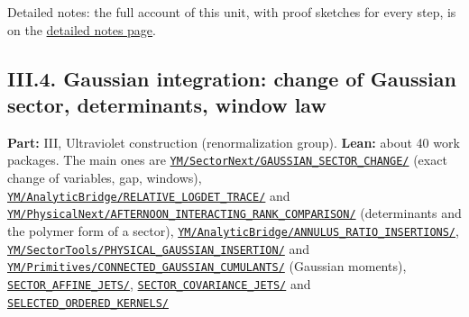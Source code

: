 \documentclass[
  letterpaper,
  11pt]{article}
\begin{document}
Detailed notes: the full account of this unit, with proof sketches for
every step, is on the
\href{https://github.com/scottnarmstrong/yang-mills-informalization/blob/main/outline/notes/III-3.md}{detailed
notes page}.

\subsection{III.4. Gaussian integration: change of Gaussian sector,
determinants, window
law}\label{iii.4.-gaussian-integration-change-of-gaussian-sector-determinants-window-law}

\textbf{Part:} III, Ultraviolet construction (renormalization group).
\textbf{Lean:} about 40 work packages. The main ones are
\href{https://github.com/yang-mills-group/OpenAI-YM-20261028/tree/3456e5e75cf8d4cd558955a5c7638fba2d68f464/YM/SectorNext/GAUSSIAN_SECTOR_CHANGE}{\texttt{YM/SectorNext/GAUSSIAN\_SECTOR\_CHANGE/}}
(exact change of variables, gap, windows),
\href{https://github.com/yang-mills-group/OpenAI-YM-20261028/tree/3456e5e75cf8d4cd558955a5c7638fba2d68f464/YM/AnalyticBridge/RELATIVE_LOGDET_TRACE}{\texttt{YM/AnalyticBridge/RELATIVE\_LOGDET\_TRACE/}}
and
\href{https://github.com/yang-mills-group/OpenAI-YM-20261028/tree/3456e5e75cf8d4cd558955a5c7638fba2d68f464/YM/PhysicalNext/AFTERNOON_INTERACTING_RANK_COMPARISON}{\texttt{YM/PhysicalNext/AFTERNOON\_INTERACTING\_RANK\_COMPARISON/}}
(determinants and the polymer form of a sector),
\href{https://github.com/yang-mills-group/OpenAI-YM-20261028/tree/3456e5e75cf8d4cd558955a5c7638fba2d68f464/YM/AnalyticBridge/ANNULUS_RATIO_INSERTIONS}{\texttt{YM/AnalyticBridge/ANNULUS\_RATIO\_INSERTIONS/}},
\href{https://github.com/yang-mills-group/OpenAI-YM-20261028/tree/3456e5e75cf8d4cd558955a5c7638fba2d68f464/YM/SectorTools/PHYSICAL_GAUSSIAN_INSERTION}{\texttt{YM/SectorTools/PHYSICAL\_GAUSSIAN\_INSERTION/}}
and
\href{https://github.com/yang-mills-group/OpenAI-YM-20261028/tree/3456e5e75cf8d4cd558955a5c7638fba2d68f464/YM/Primitives/CONNECTED_GAUSSIAN_CUMULANTS}{\texttt{YM/Primitives/CONNECTED\_GAUSSIAN\_CUMULANTS/}}
(Gaussian moments),
\href{https://github.com/yang-mills-group/OpenAI-YM-20261028/tree/3456e5e75cf8d4cd558955a5c7638fba2d68f464/YM/AnalyticBridge/SECTOR_AFFINE_JETS}{\texttt{SECTOR\_AFFINE\_JETS/}},
\href{https://github.com/yang-mills-group/OpenAI-YM-20261028/tree/3456e5e75cf8d4cd558955a5c7638fba2d68f464/YM/AnalyticBridge/SECTOR_COVARIANCE_JETS}{\texttt{SECTOR\_COVARIANCE\_JETS/}}
and
\href{https://github.com/yang-mills-group/OpenAI-YM-20261028/tree/3456e5e75cf8d4cd558955a5c7638fba2d68f464/YM/AnalyticBridge/SELECTED_ORDERED_KERNELS}{\texttt{SELECTED\_ORDERED\_KERNELS/}}
\end{document}
